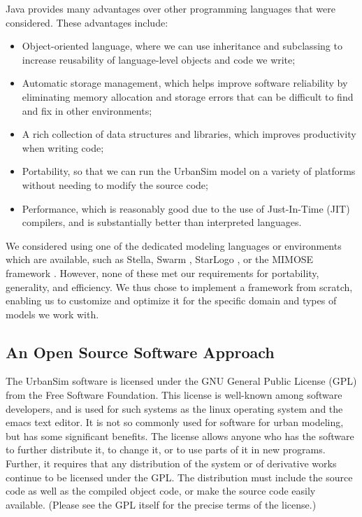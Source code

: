 Java provides many
advantages over other programming languages that were considered.
These advantages include:
 \begin{itemize}
 \item
 Object-oriented language, where we can use inheritance and subclassing to
 increase reusability of language-level objects and code we write;
 \item
 Automatic storage management, which helps improve software reliability by
 eliminating memory allocation and storage errors that can be difficult to
 find and fix in other environments;
 \item
 A rich collection of data structures and libraries, which improves
 productivity when writing code;
 \item
 Portability, so that we can run the UrbanSim model on a variety of
 platforms without needing to modify the source code;
 \item
 Performance, which is reasonably good due to the use of Just-In-Time ({JIT})
 compilers, and is substantially better than interpreted languages.
 \end{itemize}
We considered using one of the dedicated modeling languages or
environments which are available, such as Stella,
Swarm \citep{luna-2000,swarm-web}, StarLogo \citep{starlogo-java-web},
or the {MIMOSE} framework \citep{mohring-96}.
However, none of these met our requirements for portability,
generality, and efficiency.  We thus chose to implement a framework
from scratch, enabling us to customize and optimize it for the specific
domain and types of models we work with.

\subsection{An Open Source Software Approach}

The UrbanSim software is licensed under the GNU General Public License
(GPL) from the Free Software Foundation.  This license is well-known among
software developers, and is used for such systems as the linux operating
system and the emacs text editor.  It is not so commonly used for software
for urban modeling, but has some significant benefits.  The license allows
anyone who has the software to further distribute it, to change it, or to
use parts of it in new programs.  Further, it requires that any
distribution of the system or of derivative works continue to be licensed
under the GPL\@.  The distribution must include the source code as well as
the compiled object code, or make the source code easily available.
(Please see the GPL itself \citep{gpl-web} for the precise terms of the
license.)

